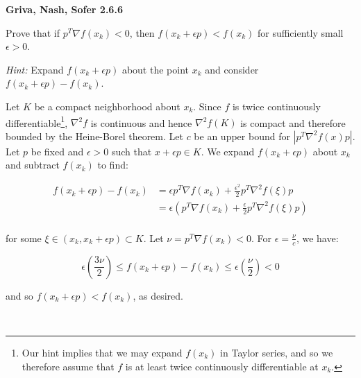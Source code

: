 \textbf{Griva, Nash, Sofer 2.6.6}

Prove that if $p^T \nabla f(x_k) < 0$, then $f(x_k + \epsilon p) < f(x_k)$ for 
sufficiently small $\epsilon > 0$.

\textit{Hint: } Expand $f(x_k + \epsilon p)$ about the point $x_k$ and consider
$f(x_k + \epsilon p) - f(x_k)$.

\begin{solution}
  Let $K$ be a compact neighborhood about $x_k$. Since $f$ is twice continuously
  differentiable\footnote{
    Our hint implies that we may expand $f(x_k)$ in Taylor series, and so we therefore 
    assume that $f$ is at least twice continuously differentiable at $x_k$.
  }, $\nabla^2 f$ is continuous and hence $\nabla^2 f(K)$ is compact and therefore bounded
  by the Heine-Borel theorem. Let $c$ be an upper bound for $|p^T \nabla^2 f(x) p|$.
  Let $p$ be fixed and $\epsilon > 0$ such that $x + \epsilon p \in K$. We expand 
  $f(x_k + \epsilon p)$ about $x_k$ and subtract $f(x_k)$ to find:

  \begin{align*}
    f(x_k + \epsilon p) - f(x_k) &= \epsilon p^T \nabla f(x_k) + \frac{\epsilon^2}{2} p^T \nabla^2 f(\xi) p \\
                                 &= \epsilon \left(p^T \nabla f(x_k) + \frac{\epsilon}{2} p^T \nabla^2 f(\xi) p \right) \\
  \end{align*}

  for some $\xi \in (x_k, x_k + \epsilon p) \subset K$. Let $\nu = p^T \nabla f(x_k) < 0$.
  For $\epsilon = \frac{\nu}{c}$, we have:

  $$
  \epsilon \left(\frac{3 \nu}{2} \right) \le f(x_k + \epsilon p) - f(x_k) \le \epsilon \left(\frac{\nu}{2} \right) < 0
  $$

  and so $f(x_k + \epsilon p) < f(x_k)$, as desired.

  \ \\
\end{solution}